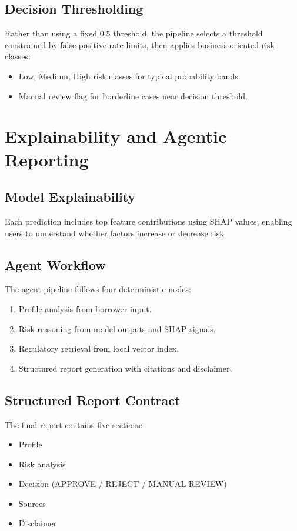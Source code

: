 \documentclass[12pt,a4paper]{article}
\begin{document}
\subsection{Decision Thresholding}
Rather than using a fixed 0.5 threshold, the pipeline selects a threshold constrained by false positive rate limits, then applies business-oriented risk classes:
\begin{itemize}[leftmargin=1.5em]
  \item Low, Medium, High risk classes for typical probability bands.
  \item Manual review flag for borderline cases near decision threshold.
\end{itemize}

\section{Explainability and Agentic Reporting}
\subsection{Model Explainability}
Each prediction includes top feature contributions using SHAP values, enabling users to understand whether factors increase or decrease risk.

\subsection{Agent Workflow}
The agent pipeline follows four deterministic nodes:
\begin{enumerate}[leftmargin=1.7em]
  \item Profile analysis from borrower input.
  \item Risk reasoning from model outputs and SHAP signals.
  \item Regulatory retrieval from local vector index.
  \item Structured report generation with citations and disclaimer.
\end{enumerate}

\subsection{Structured Report Contract}
The final report contains five sections:
\begin{itemize}[leftmargin=1.5em]
  \item Profile
  \item Risk analysis
  \item Decision (APPROVE / REJECT / MANUAL REVIEW)
  \item Sources
  \item Disclaimer
\end{itemize}
\end{document}
